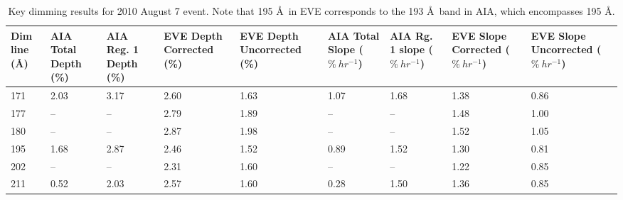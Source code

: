 \begin{table}[!h]
    \caption[Key dimming results for 2010 August 7 event]{
        Key dimming results for 2010 August 7 event. Note that 195 \AA\ in EVE corresponds to the 193 \AA\ band in AIA, 
        which encompasses 195 \AA. 
    }
    \begin{center}
    \begin{tabular}{|p{1cm}|p{1cm}|p{1.2cm}|p{1.8cm}|p{1.8cm}|p{1.4cm}|p{1.4cm}|p{1.7cm}|p{1.7cm}|} \hline
	Dim line (\AA) & AIA Total Depth (\%) & AIA Reg. 1 Depth (\%) & EVE Depth Corrected (\%) & EVE Depth Uncorrected (\%) & AIA Total Slope ($\%\ hr^{-1}$) & AIA Rg. 1 slope ($\%\ hr^{-1}$) & EVE Slope Corrected ($\%\ hr^{-1}$) & EVE Slope Uncorrected ($\%\ hr^{-1}$) \\ \hline \hline
	171 & 2.03 & 3.17 & 2.60 & 1.63 & 1.07 & 1.68 & 1.38 & 0.86 \\ \hline
	177 & -- & -- & 2.79 & 1.89 & -- & -- & 1.48 & 1.00 \\ \hline
	180 & -- & -- & 2.87 & 1.98 & -- & -- & 1.52 & 1.05 \\ \hline
	195 & 1.68 & 2.87 & 2.46 & 1.52 & 0.89 & 1.52 & 1.30 & 0.81 \\ \hline
	202 & -- & -- & 2.31 & 1.60 & -- & -- & 1.22 & 0.85 \\ \hline
	211 & 0.52 & 2.03 & 2.57 & 1.60 & 0.28 & 1.50 & 1.36 & 0.85 \\ \hline
	\end{tabular}
    \\ \rule{0mm}{5mm}
    \end{center}
    \label{tab:dimmingresults2010aug7}
\end{table} 

